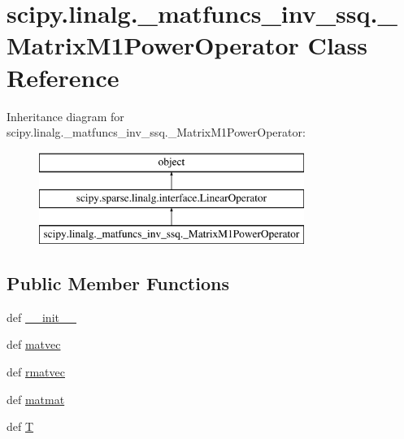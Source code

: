 \hypertarget{classscipy_1_1linalg_1_1__matfuncs__inv__ssq_1_1__MatrixM1PowerOperator}{}\section{scipy.\+linalg.\+\_\+matfuncs\+\_\+inv\+\_\+ssq.\+\_\+\+Matrix\+M1\+Power\+Operator Class Reference}
\label{classscipy_1_1linalg_1_1__matfuncs__inv__ssq_1_1__MatrixM1PowerOperator}
Inheritance diagram for scipy.\+linalg.\+\_\+matfuncs\+\_\+inv\+\_\+ssq.\+\_\+\+Matrix\+M1\+Power\+Operator\+:\begin{figure}[H]
\begin{center}
\leavevmode
\includegraphics[height=3.000000cm]{classscipy_1_1linalg_1_1__matfuncs__inv__ssq_1_1__MatrixM1PowerOperator}
\end{center}
\end{figure}
\subsection*{Public Member Functions}
\begin{DoxyCompactItemize}
\item 
def \hyperlink{classscipy_1_1linalg_1_1__matfuncs__inv__ssq_1_1__MatrixM1PowerOperator_aca8e818f0305409584cc8a50ea2e113a}{\+\_\+\+\_\+init\+\_\+\+\_\+}
\item 
def \hyperlink{classscipy_1_1linalg_1_1__matfuncs__inv__ssq_1_1__MatrixM1PowerOperator_a4c87fb59e0b7c168e30e9edd419887de}{matvec}
\item 
def \hyperlink{classscipy_1_1linalg_1_1__matfuncs__inv__ssq_1_1__MatrixM1PowerOperator_a8450b74d7eab662dec3e753059c596bc}{rmatvec}
\item 
def \hyperlink{classscipy_1_1linalg_1_1__matfuncs__inv__ssq_1_1__MatrixM1PowerOperator_ab62d325ab0e9e5a1a3373ea94be449b3}{matmat}
\item 
def \hyperlink{classscipy_1_1linalg_1_1__matfuncs__inv__ssq_1_1__MatrixM1PowerOperator_a28a815bee04d45e1449ed720ea5001fc}{T}
\end{DoxyCompactItemize}

